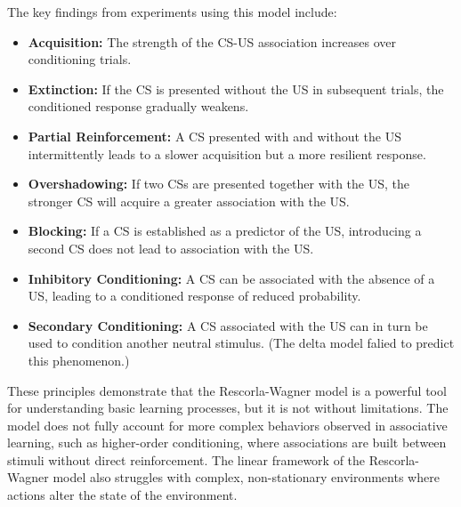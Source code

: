 \documentclass[11pt]{book} %
\begin{document}
The key findings from experiments using this model include:
\begin{itemize}
    \item \textbf{Acquisition:} The strength of the CS-US association increases over conditioning trials.
    \item \textbf{Extinction:} If the CS is presented without the US in subsequent trials, the conditioned response gradually weakens.
    \item \textbf{Partial Reinforcement:} A CS presented with and without the US intermittently leads to a slower acquisition but a more resilient response.
    \item \textbf{Overshadowing:} If two CSs are presented together with the US, the stronger CS will acquire a greater association with the US.
    \item \textbf{Blocking:} If a CS is established as a predictor of the US, introducing a second CS does not lead to association with the US.
    \item \textbf{Inhibitory Conditioning:} A CS can be associated with the absence of a US, leading to a conditioned response of reduced probability.
    \item \textbf{Secondary Conditioning:} A CS associated with the US can in turn be used to condition another neutral stimulus. (The delta model falied to predict this phenomenon.)
\end{itemize}

These principles demonstrate that the Rescorla-Wagner model is a powerful tool for understanding basic learning processes, but it is not without limitations. 
The model does not fully account for more complex behaviors observed in associative learning, 
such as higher-order conditioning, where associations are built between stimuli without direct reinforcement. 
The linear framework of the Rescorla-Wagner model also struggles with complex, non-stationary environments where actions alter the state of the environment.
\end{document}
